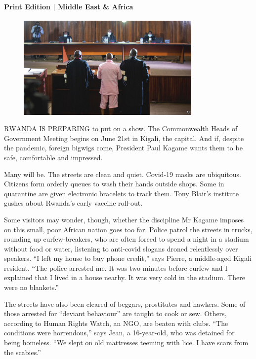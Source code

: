 \documentclass{article}
\begin{document}
\paragraph{Print Edition | Middle East \& Africa  \quad \color{gray}{Mar 27th 2021 }}
\begin{figure}[h]
\centering
\includegraphics[width=0.8\textwidth]{images/20210327_MAP001_0.jpg}
\end{figure}
\lettrine{R}WANDA IS PREPARING to put on a show. The Commonwealth Heads of Government Meeting begins on June 21st in Kigali, the capital. And if, despite the pandemic, foreign bigwigs come, President Paul Kagame wants them to be safe, comfortable and impressed. 

Many will be. The streets are clean and quiet. Covid-19 masks are ubiquitous. Citizens form orderly queues to wash their hands outside shops. Some in quarantine are given electronic bracelets to track them. Tony Blair's institute gushes about Rwanda's early vaccine roll-out. 

Some visitors may wonder, though, whether the discipline Mr Kagame imposes on this small, poor African nation goes too far. Police patrol the streets in trucks, rounding up curfew-breakers, who are often forced to spend a night in a stadium without food or water, listening to anti-covid slogans droned relentlessly over speakers. ``I left my house to buy phone credit,'' says Pierre, a middle-aged Kigali resident. ``The police arrested me. It was two minutes before curfew and I explained that I lived in a house nearby. It was very cold in the stadium. There were no blankets.'' 

The streets have also been cleared of beggars, prostitutes and hawkers. Some of those arrested for ``deviant behaviour'' are taught to cook or sew. Others, according to Human Rights Watch, an NGO, are beaten with clubs. ``The conditions were horrendous,'' says Jean, a 16-year-old, who was detained for being homeless. ``We slept on old mattresses teeming with lice. I have scars from the scabies.'' 
\end{document}
